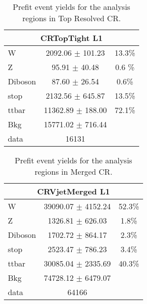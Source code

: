 \begin{table}
\caption{Prefit event yields for the analysis regions in Top Resolved CR.}
\label{tab:PrefitYield_TCRRes_Per}
\begin{center}
\begin{tabular}{|l|c| c|}
\hline
\multicolumn{3}{|c|}{CRTopTight L1}\\ \hline
W & 2092.06 $\pm$ 101.23 & 13.3\% \\
Z & 95.91 $\pm$ 40.48 & 0.6 \% \\
Diboson & 87.60 $\pm$ 26.54 & 0.6\%  \\
stop & 2132.56 $\pm$ 645.87 & 13.5\% \\
ttbar & 11362.89 $\pm$ 188.00 & 72.1\%\\
\hline
Bkg & 15771.02 $\pm$ 716.44 & \\
\hline
data & 16131 & \\ \hline
\end{tabular}
\end{center}
\end{table}

\begin{table}
\caption{Prefit event yields for the analysis regions in \Wjets Merged CR.}
\label{tab:PrefitYield_WCRMer_Per}
\begin{center}
\begin{tabular}{|l|c|c|}
\hline
\multicolumn{3}{|c|}{CRVjetMerged L1}\\ \hline
W & 39090.07 $\pm$ 4152.24 & 52.3\% \\
Z & 1326.81 $\pm$ 626.03 & 1.8\% \\
Diboson & 1702.72 $\pm$ 864.17 & 2.3\%\\
stop & 2523.47 $\pm$ 786.23 & 3.4\% \\
ttbar & 30085.04 $\pm$ 2335.69 & 40.3\% \\
\hline
Bkg & 74728.12 $\pm$ 6479.07 & \\
\hline
data & 64166 & \\ \hline
\end{tabular}
\end{center}
\end{table}


